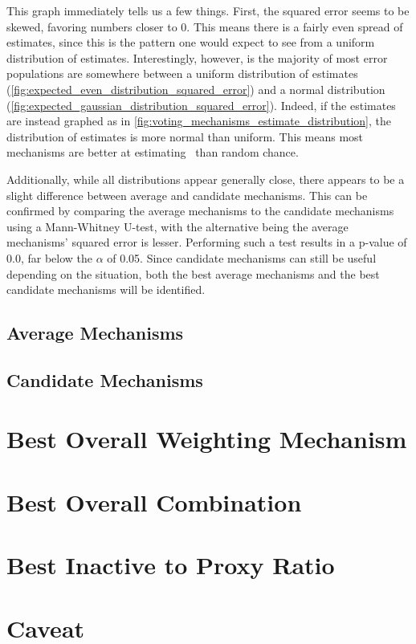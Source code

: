 This graph immediately tells us a few things.
First, the squared error seems to be skewed, favoring numbers closer to 0.
This means there is a fairly even spread of estimates, since this is the
pattern one would expect to see from a uniform distribution of estimates.
Interestingly, however, is the majority of most error populations are
somewhere between a uniform distribution of estimates
(\autoref{fig:expected_even_distribution_squared_error}) and a normal
distribution (\autoref{fig:expected_gaussian_distribution_squared_error}).
Indeed, if the estimates are instead graphed as in
\autoref{fig:voting_mechanisms_estimate_distribution}, the distribution of estimates
is more normal than uniform.
This means most mechanisms are better at estimating \truth\ than random chance.

Additionally, while all distributions appear generally close, there appears to be a
slight difference between average and candidate mechanisms.
This can be confirmed by comparing the average mechanisms to the candidate mechanisms
using a Mann-Whitney U-test, with the alternative being the average mechanisms'
squared error is lesser.
Performing such a test results in a p-value of 0.0, far below the $\alpha$ of 0.05.
Since candidate mechanisms can still be useful depending on the situation, both the
best average mechanisms and the best candidate mechanisms will be identified.

\subsection{Average Mechanisms}\label{subsec:lowest-error-average-mechanisms}

\subsection{Candidate Mechanisms}\label{subsec:lowest-error-candidate-mechanisms}


\section{Best Overall Weighting Mechanism}\label{sec:best-overall-weighting-mechanism}


\section{Best Overall Combination}\label{sec:best-overall-combination}


\section{Best Inactive to Proxy Ratio}\label{sec:best-inactive-to-proxy-count}


\section{Caveat}\label{sec:caveat}

